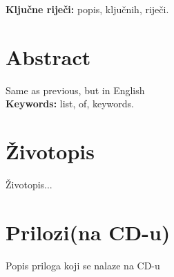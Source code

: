 \documentclass[a4paper]{article}
\begin{document}
{\bfseries Ključne riječi:} popis, ključnih, riječi.

\section*{Abstract}

Same as previous, but in English\\


{\bfseries Keywords:} list, of, keywords.

\section*{Životopis}

Životopis... %

\section*{Prilozi(na CD-u)}

Popis priloga koji se nalaze na CD-u
\end{document}
